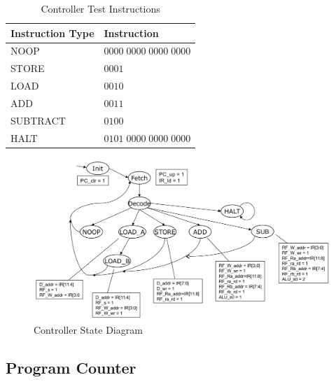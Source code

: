 \begin{table}
    \centering
    \begin{tabular}{ll}                                             \toprule
        \textbf{Instruction Type}   & \textbf{Instruction}          \\\midrule
        NOOP                        & $0000 \; 0000 \; 0000 \; 0000$  \\
        STORE                       & $0001 \;                     $  \\  %
        LOAD                        & $0010 \;                     $  \\  %
        ADD                         & $0011 \;                     $  \\  %
        SUBTRACT                    & $0100 \;                     $  \\  %
        HALT                        & $0101 \; 0000 \; 0000 \; 0000$ \\\bottomrule
    \end{tabular}
    \caption{Controller Test Instructions\label{tab:controller_test_instructions}}
\end{table}

\begin{figure}
    \includegraphics[width=\textwidth]{images/state_diagram.png}
    \caption{Controller State Diagram \label{fig:state_diagram}}
\end{figure}


\subsection{Program Counter} %
\label{sub:program_counter_pro}

